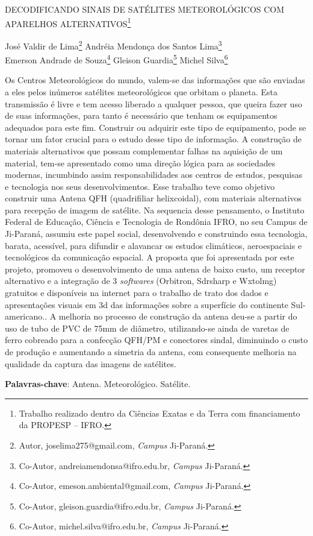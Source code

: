 \documentclass[article,12pt,onesidea,4paper,english,brazil]{abntex2}
\begin{document}
	
	
	\frenchspacing 
	
	\begin{center}
		\LARGE DECODIFICANDO SINAIS DE SATÉLITES METEOROLÓGICOS COM APARELHOS ALTERNATIVOS\footnote{Trabalho realizado dentro da Ciências Exatas e da Terra com financiamento da PROPESP – IFRO.}
		
		\normalsize
		José Valdir de Lima\footnote{Autor, joselima275@gmail.com, \textit{Campus} Ji-Paraná.} 
		Andréia Mendonça dos Santos Lima\footnote{Co-Autor, andreiamendonsa@ifro.edu.br, \textit{Campus} Ji-Paraná.} \\
		Emerson Andrade de Souza\footnote{Co-Autor, emeson.ambiental@gmail.com, \textit{Campus} Ji-Paraná.} 
		Gleison Guardia\footnote{Co-Autor, gleison.guardia@ifro.edu.br, \textit{Campus} Ji-Paraná.}
		Michel Silva\footnote{Co-Autor, michel.silva@ifro.edu.br, \textit{Campus} Ji-Paraná.} 
	\end{center}
	
	\noindent Os Centros Meteorológicos do mundo, valem-se das informações que são enviadas
	a eles pelos inúmeros satélites meteorológicos que orbitam o planeta. Esta
	transmissão é livre e tem acesso liberado a qualquer pessoa, que queira fazer uso
	de suas informações, para tanto é necessário que tenham os equipamentos
	adequados para este fim. Construir ou adquirir este tipo de equipamento, pode se
	tornar um fator crucial para o estudo desse tipo de informação. A construção de
	materiais alternativos que possam complementar falhas na aquisição de um
	material, tem-se apresentado como uma direção lógica para as sociedades
	modernas, incumbindo assim responsabilidades aos centros de estudos, pesquisas
	e tecnologia nos seus desenvolvimentos. Esse trabalho teve como objetivo construir
	uma Antena QFH (quadrifiliar helixcoidal), com materiais alternativos para recepção
	de imagem de satélite. Na sequencia desse pensamento, o Instituto Federal de
	Educação, Ciência e Tecnologia de Rondônia IFRO, no seu Campus de Ji-Paraná,
	assumiu este papel social, desenvolvendo e construindo essa tecnologia, barata,
	acessível, para difundir e alavancar os estudos climáticos, aeroespaciais e
	tecnológicos da comunicação espacial. A proposta que foi apresentada por este
	projeto, promoveu o desenvolvimento de uma antena de baixo custo, um receptor
	alternativo e a integração de 3 \textit{softwares} (Orbitron, Sdrsharp e Wxtolmg) gratuitos e
	disponíveis na internet para o trabalho de trato dos dados e apresentações visuais
	em 3d das informações sobre a superfície do continente Sul-americano.. A melhoria
	no processo de construção da antena deu-se a partir do uso de tubo de PVC de
	75mm de diâmetro, utilizando-se ainda de varetas de ferro cobreado para a
	confecção QFH/PM e conectores sindal, diminuindo o custo de produção e
	aumentando a simetria da antena, com consequente melhoria na qualidade da
	captura das imagens de satélites.
	
	\vspace{\onelineskip}
	
	\noindent
	\textbf{Palavras-chave}: Antena. Meteorológico. Satélite.
	
\end{document}

